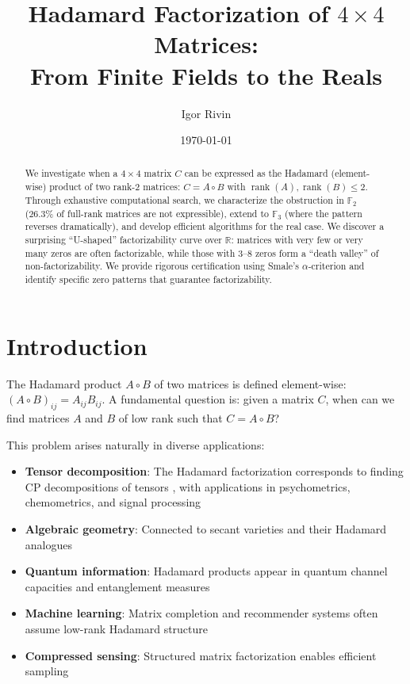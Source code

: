 \documentclass{article}
\title{Hadamard Factorization of $4 \times 4$ Matrices: \\ From Finite Fields to the Reals}
\author{Igor Rivin}
\date{\today}
\theoremstyle{definition}
\DeclareMathOperator{\rank}{rank}
\begin{document}
\maketitle

\begin{abstract}
We investigate when a $4 \times 4$ matrix $C$ can be expressed as the Hadamard (element-wise) product of two rank-2 matrices: $C = A \circ B$ with $\rank(A), \rank(B) \leq 2$. Through exhaustive computational search, we characterize the obstruction in $\mathbb{F}_2$ (26.3\% of full-rank matrices are not expressible), extend to $\mathbb{F}_3$ (where the pattern reverses dramatically), and develop efficient algorithms for the real case. We discover a surprising ``U-shaped'' factorizability curve over $\mathbb{R}$: matrices with very few or very many zeros are often factorizable, while those with 3--8 zeros form a ``death valley'' of non-factorizability. We provide rigorous certification using Smale's $\alpha$-criterion and identify specific zero patterns that guarantee factorizability.
\end{abstract}

\section{Introduction}

The Hadamard product $A \circ B$ of two matrices is defined element-wise: $(A \circ B)_{ij} = A_{ij} B_{ij}$. A fundamental question is: given a matrix $C$, when can we find matrices $A$ and $B$ of low rank such that $C = A \circ B$?

This problem arises naturally in diverse applications:
\begin{itemize}
\item \textbf{Tensor decomposition}: The Hadamard factorization corresponds to finding CP decompositions of tensors \cite{kolda2009tensor}, with applications in psychometrics, chemometrics, and signal processing
\item \textbf{Algebraic geometry}: Connected to secant varieties and their Hadamard analogues \cite{bocci2024hadamard}
\item \textbf{Quantum information}: Hadamard products appear in quantum channel capacities and entanglement measures \cite{watrous2018theory}
\item \textbf{Machine learning}: Matrix completion and recommender systems often assume low-rank Hadamard structure \cite{srebro2005rank}
\item \textbf{Compressed sensing}: Structured matrix factorization enables efficient sampling \cite{candes2011tight}
\end{itemize}
\end{document}
